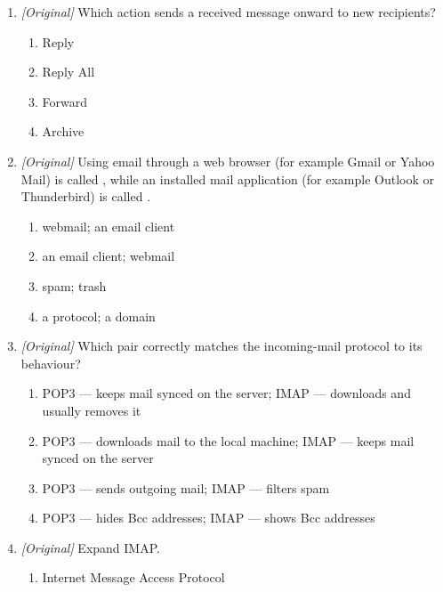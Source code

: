 \begin{enumerate}[label=\textbf{Q\arabic*.}, leftmargin=*]
  \begin{enumerate}[label=\Alph*.]
    \item Forward
    \item Reply All
    \item Save as Draft
    \item Mark as Spam
  \end{enumerate}
\item \textit{[Original]} Which action sends a received message onward to new recipients?
  \begin{enumerate}[label=\Alph*.]
    \item Reply
    \item Reply All
    \item Forward
    \item Archive
  \end{enumerate}
\item \textit{[Original]} Using email through a web browser (for example Gmail or Yahoo Mail) is called \underline{\hspace{2.2cm}}, while an installed mail application (for example Outlook or Thunderbird) is called \underline{\hspace{2.2cm}}.
  \begin{enumerate}[label=\Alph*.]
    \item webmail; an email client
    \item an email client; webmail
    \item spam; trash
    \item a protocol; a domain
  \end{enumerate}
\item \textit{[Original]} Which pair correctly matches the incoming-mail protocol to its behaviour?
  \begin{enumerate}[label=\Alph*.]
    \item POP3 --- keeps mail synced on the server; IMAP --- downloads and usually removes it
    \item POP3 --- downloads mail to the local machine; IMAP --- keeps mail synced on the server
    \item POP3 --- sends outgoing mail; IMAP --- filters spam
    \item POP3 --- hides Bcc addresses; IMAP --- shows Bcc addresses
  \end{enumerate}
\item \textit{[Original]} Expand IMAP.
  \begin{enumerate}[label=\Alph*.]
    \item Internet Message Access Protocol

\end{enumerate}
\end{enumerate}

